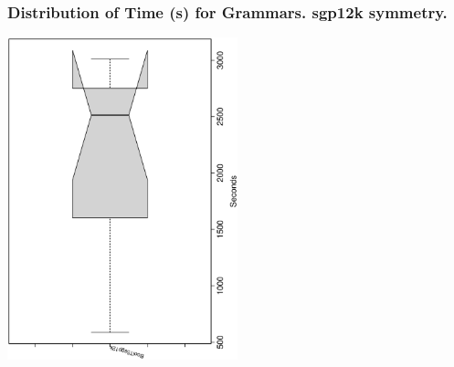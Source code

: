  \begin{frame}
 \frametitle{ Distribution of Time (s) for Grammars. sgp12k  symmetry. }
 \begin{center}
\includegraphics[width=0.5\textwidth, angle=-90]
{ExpFboxplottSeconds010.eps}
 \end{center}
 \label{ExpFboxplottSeconds010.eps}  
 \end{frame}

